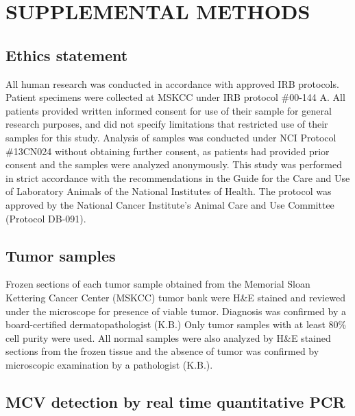 \documentclass[10pt]{article}
\date{}
\begin{document}

\section*{SUPPLEMENTAL METHODS}

\subsection*{Ethics statement}

All human research was conducted in accordance with approved IRB protocols.
Patient specimens were collected at MSKCC under IRB protocol \#00-144 A.
All patients provided written informed consent for use of their sample for general research purposes, and did not specify limitations that restricted use of their samples for this study.
Analysis of samples was conducted under NCI Protocol \#13CN024 without obtaining further consent, as patients had provided prior consent and the samples were analyzed anonymously.
This study was performed in strict accordance with the recommendations in the Guide for the Care and Use of Laboratory Animals of the National Institutes of Health.
The protocol was approved by the National Cancer Institute's Animal Care and Use Committee (Protocol DB-091).

\subsection*{Tumor samples}
Frozen sections of each tumor sample obtained from the Memorial Sloan Kettering Cancer Center (MSKCC) tumor bank were H\&E stained and reviewed under the microscope for presence of viable tumor.
Diagnosis was confirmed by a board-certified dermatopathologist (K.B.) Only tumor samples with at least 80\% cell purity were used.
All normal samples were also analyzed by H\&E stained sections from the frozen tissue and the absence of tumor was confirmed by microscopic examination by a pathologist (K.B.).

\subsection*{MCV detection by real time quantitative PCR}
\end{document}

